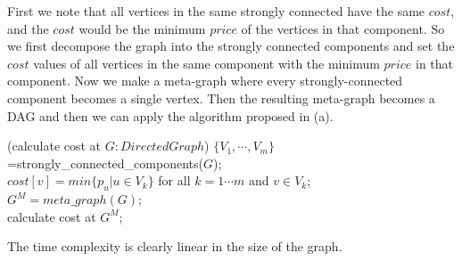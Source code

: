 \documentclass{article}
\begin{document}
First we note that all vertices in the same strongly connected have the same $cost$, and the $cost$ would be the minimum $price$ of the vertices in that component. So we first decompose the graph into the strongly connected components and set the $cost$ values of all vertices in the same component with the minimum $price$ in that component. Now we make a meta-graph where every strongly-connected component becomes a single vertex. Then the resulting meta-graph becomes a DAG and then we can apply the algorithm  proposed in (a).\\
\begin{algorithm}
	\Begin(calculate cost at \(G: Directed Graph\)){
		$\{V_1,\cdots,V_m\}$=strongly\_connected\_components($G$);\\
		$cost[v]=min\{p_u|u\in V_k\}$ for all $k=1\cdots m$ and $v\in V_k$;\\
		$G^M=meta\_graph(G)$;\\
		calculate cost at $G^M$;\\
	}
\end{algorithm}
The time complexity is clearly linear in the size of the graph.
\pagebreak
\pagebreak
\pagebreak
\pagebreak
\pagebreak
\pagebreak
\end{document}
